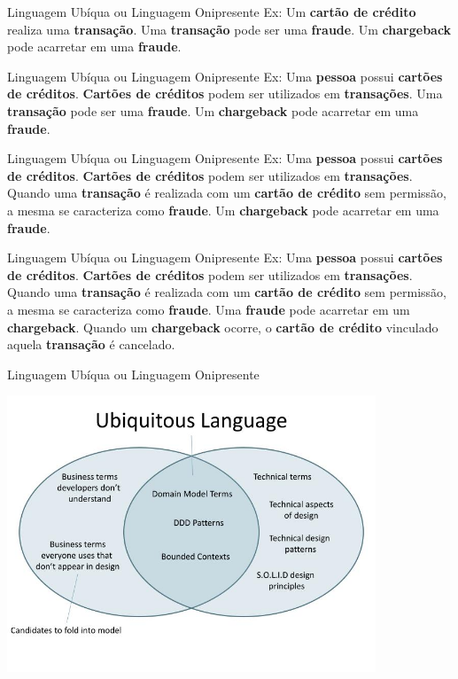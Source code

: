 \documentclass[aspectratio=169]{beamer}
\newcommand{\ubiquitouslanguagesample}{Ex: Uma \textbf{pessoa} possui \textbf{cartões de créditos}. \textbf{Cartões de créditos} podem ser utilizados em \textbf{transações}. Quando uma \textbf{transação} é realizada com um \textbf{cartão de crédito} sem permissão, a mesma se caracteriza como \textbf{fraude}. Uma \textbf{fraude} pode acarretar em um \textbf{chargeback}. Quando um \textbf{chargeback} ocorre, o \textbf{cartão de crédito} vinculado aquela \textbf{transação} é cancelado.}
\begin{document}
\begin{frame}{Linguagem Ubíqua ou Linguagem Onipresente}
	Ex: Um \textbf{cartão de crédito} realiza uma \textbf{transação}. Uma \textbf{transação} pode ser uma \textbf{fraude}. Um \textbf{chargeback} pode acarretar em uma \textbf{fraude}.
\end{frame}

\begin{frame}{Linguagem Ubíqua ou Linguagem Onipresente}
	Ex: Uma \textbf{pessoa} possui \textbf{cartões de créditos}. \textbf{Cartões de créditos} podem ser utilizados em \textbf{transações}. Uma \textbf{transação} pode ser uma \textbf{fraude}. Um \textbf{chargeback} pode acarretar em uma \textbf{fraude}.
\end{frame}

\begin{frame}{Linguagem Ubíqua ou Linguagem Onipresente}
	Ex: Uma \textbf{pessoa} possui \textbf{cartões de créditos}. \textbf{Cartões de créditos} podem ser utilizados em \textbf{transações}. Quando uma \textbf{transação} é realizada com um \textbf{cartão de crédito} sem permissão, a mesma se caracteriza como \textbf{fraude}. Um \textbf{chargeback} pode acarretar em uma \textbf{fraude}.
\end{frame}

\begin{frame}{Linguagem Ubíqua ou Linguagem Onipresente}
	\ubiquitouslanguagesample
\end{frame}

\begin{frame}{Linguagem Ubíqua ou Linguagem Onipresente}	
	\begin{center}
		\includegraphics[width=11cm]{imgs/ubiquitous-language}
	\end{center}
\end{frame}
\end{document}
